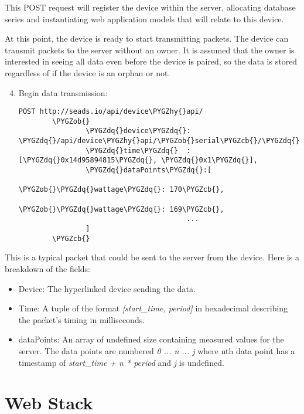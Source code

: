 \documentclass[letterpaper,10pt,english]{sphinxmanual}
\def\PYGZob{\char`\{}
\def\PYGZcb{\char`\}}
\def\PYGZhy{\char`\-}
\def\PYGZdq{\char`\"}
\begin{document}
This POST request will register the device within the server, allocating database series and instantiating web application models that will relate to this device.

At this point, the device is ready to start transmitting packets. The device can transmit packets to the server without an owner. It is assumed that the owner is interested in seeing all data even before the device is paired, so the data is stored regardless of if the device is an orphan or not.
\begin{enumerate}
\setcounter{enumi}{3}
\item {} 
Begin data transmission:

\begin{Verbatim}[commandchars=\\\{\}]
POST http://seads.io/api/device\PYGZhy{}api/
        \PYGZob{}
                \PYGZdq{}device\PYGZdq{}: \PYGZdq{}/api/device\PYGZhy{}api/\PYGZob{}serial\PYGZcb{}/\PYGZdq{},
                \PYGZdq{}time\PYGZdq{}  : [\PYGZdq{}0x14d95894815\PYGZdq{}, \PYGZdq{}0x1\PYGZdq{}],
                \PYGZdq{}dataPoints\PYGZdq{}:[
                                        \PYGZob{}\PYGZdq{}wattage\PYGZdq{}: 170\PYGZcb{},
                                        \PYGZob{}\PYGZdq{}wattage\PYGZdq{}: 169\PYGZcb{},
                                        ...
                ]
        \PYGZcb{}
\end{Verbatim}

\end{enumerate}

This is a typical packet that could be sent to the server from the device. Here is a breakdown of the fields:
\begin{itemize}
\item {} 
Device: The hyperlinked device sending the data.

\item {} 
Time: A tuple of the format \emph{{[}start\_time, period{]}} in hexadecimal describing the packet's timing in milliseconds.

\item {} 
dataPoints: An array of undefined size containing measured values for the server. The data points are numbered \emph{0 ... n ... j} where nth data point has a timestamp of \emph{start\_time + n * period} and \emph{j} is undefined.

\end{itemize}


\chapter{Web Stack}
\label{modules/modules:web-stack}\label{modules/modules::doc}
\end{document}
